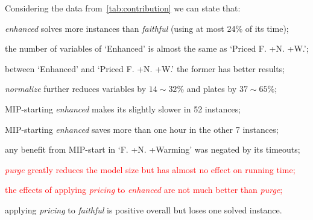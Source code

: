 \documentclass[smallextended]{svjour3}       %
\newif\iffinalversion
\newcommand{\oldtext}[1]{\iffinalversion%
\else%
\textcolor{red}{#1}%
\fi%
}
\begin{document}
Considering the data from~\autoref{tab:contribution} we can state that:
\begin{enumerate}
\item \emph{enhanced} solves more instances than \emph{faithful} (using at most 24\% of its time);
\item the number of variables of `Enhanced' is almost the same as `Priced F. +N. +W.';
\item between `Enhanced' and `Priced F. +N. +W.' the former has better results;
\item \emph{normalize} further reduces variables by \(14\sim32\)\% and plates by \(37\sim65\)\%;
\item MIP-starting \emph{enhanced} makes its slightly slower in 52 instances;
\item MIP-starting \emph{enhanced} saves more than one hour in the other 7 instances;
\item any benefit from MIP-start in `F. +N. +Warming' was negated by its timeouts;
\oldtext{\item \emph{purge} greatly reduces the model size but has almost no effect on running time;}
\oldtext{\item the effects of applying \emph{pricing} to \emph{enhanced} are not much better than \emph{purge};}
\item applying \emph{pricing} to \emph{faithful} is positive overall but loses one solved instance.
\end{enumerate}
\end{document}
